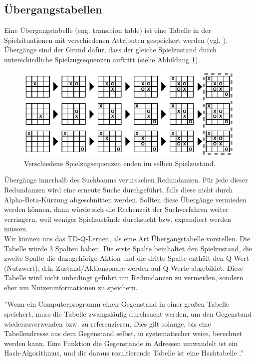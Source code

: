 \subsection{Übergangstabellen}
\label{subsec:Übergangstabellen}
Eine Übergangstabelle (eng. transition table) ist eine Tabelle in der Spielsituationen mit verschiedenen Attributen gespeichert werden (vgl. \cite[215\psq]{Russell}). Übergänge sind der Grund dafür, dass der gleiche Spielzustand durch unterschiedliche Spielzugsequenzen auftritt (siehe Abbildung \ref{fig:transitionen_tictactoe}). \\

\begin{figure}[!htbp]
  \centering
  \includegraphics{inhalt/abbildungen/transitionen_tictactoe.pdf}
  \caption{Verschiedene Spielzugsequenzen enden im selben Spielzustand.}
  \label{fig:transitionen_tictactoe}
\end{figure} 

Übergänge innerhalb des Suchbaums verursachen Redundanzen. Für jede dieser Redundanzen wird eine erneute Suche durchgeführt, falls diese nicht durch Alpha-Beta-Kürzung abgeschnitten werden. Sollten diese Übergänge vermieden werden können, dann würde sich die Rechenzeit der Suchverfahren weiter verringern, weil weniger Spielzustände durchsucht bzw. expandiert werden müssen. \\

Wir können uns das TD-Q-Lernen, als eine Art Übergangstabelle vorstellen. Die Tabelle würde 3 Spalten haben. Die erste Spalte beinhaltet den Spielzustand, die zweite Spalte die dazugehörige Aktion und die dritte Spalte enthält den Q-Wert (Nutzwert), d.h. Zustand/Aktionspaare werden auf Q-Werte abgebildet. Diese Tabelle wird nicht unbedingt geführt um Redundanzen zu vermeiden, sondern eher um Nutzeninformationen zu speichern.

''Wenn ein Computerprogramm einen Gegenstand in einer großen Tabelle speichert, muss die Tabelle zwangsläufig durchsucht werden, um den Gegenstand wiederzuverwenden bzw. zu referenzieren. Dies gilt solange, bis eine Tabellendresse aus dem Gegenstand selbst, in systematischer weise, berechnet werden kann. Eine Funktion die Gegenstände in Adressen umwandelt ist ein Hash-Algorithmus, und die daraus resultierende Tabelle ist eine Hashtabelle \cite[3]{Zobrist}.'' \\

